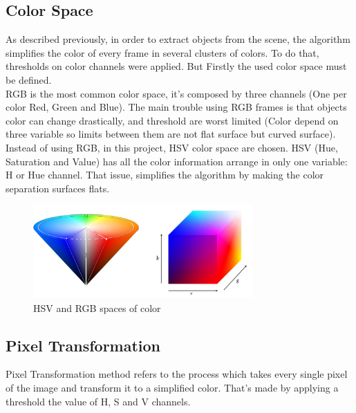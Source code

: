 \subsection{Color Space}
As described previously, in order to extract objects from the scene, the algorithm simplifies the color of every frame in several clusters of colors. To do that, thresholds on color channels were applied. But Firstly the used color space must be defined. \\
RGB is the most common color space, it's composed by three channels (One per color Red, Green and Blue). The main trouble using RGB frames is that objects color can change drastically, and threshold are worst limited (Color depend on three variable so limits between them are not flat surface but curved surface).
Instead of using RGB, in this project, HSV color space are chosen. HSV (Hue, Saturation and Value) has all the color information arrange in only one variable: H or Hue channel. That issue, simplifies the algorithm by making the color separation surfaces flats.  \\

\begin{figure}
	\centering
	\includegraphics[width=0.75\textwidth,natwidth=944,natheight=400]{../Images/c2/HSV_vs_RGB.png}
	\caption{HSV and RGB spaces of color}
	\label{fig:HSV_vs_RGB}
\end{figure}

\subsection{Pixel Transformation}
Pixel Transformation method refers to the process which takes every single pixel of the image and transform it to a simplified color. That's made by applying a threshold the value of H, S and V channels. \\

